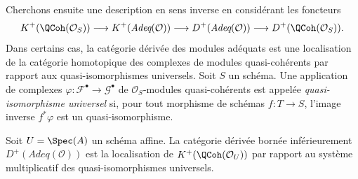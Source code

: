 \noindent
Cherchons ensuite une description en sens inverse en considérant
les foncteurs
$$
K^+(\QCoh(\mathcal{O}_S))
\longrightarrow
K^+(\textit{Adeq}(\mathcal{O}))
\longrightarrow
D^+(\textit{Adeq}(\mathcal{O}))
\longrightarrow
D^+(\QCoh(\mathcal{O}_S)).
$$
Dans certains cas, la catégorie dérivée des modules adéquats est une localisation
de la catégorie homotopique des complexes de modules quasi-cohérents par rapport
aux quasi-isomorphismes universels. Soit $S$ un schéma. Une application de complexes
$\varphi : \mathcal{F}^\bullet \to \mathcal{G}^\bullet$
de $\mathcal{O}_S$-modules quasi-cohérents est appelée
{\it quasi-isomorphisme universel} si, pour tout morphisme de schémas
$f : T \to S$, l'image inverse $f^*\varphi$ est un quasi-isomorphisme.

\begin{lemma}
\label{lemma-describe-Dplus-adequate}
Soit $U = \Spec(A)$ un schéma affine.
La catégorie dérivée bornée inférieurement
$D^+(\textit{Adeq}(\mathcal{O}))$ est la localisation
de $K^+(\QCoh(\mathcal{O}_U))$ par rapport au système multiplicatif des
quasi-isomorphismes universels.
\end{lemma}

